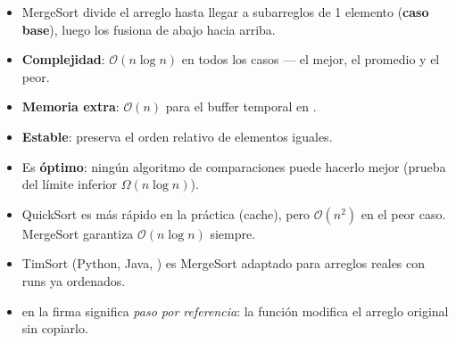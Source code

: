 \documentclass[12pt, oneside]{article}
\begin{document}
\begin{recuerda}
\begin{itemize}
  \item MergeSort divide el arreglo hasta llegar a subarreglos de 1 elemento
        (\textbf{caso base}), luego los fusiona de abajo hacia arriba.
  \item \textbf{Complejidad}: $\mathcal{O}(n \log n)$ en todos los casos —
        el mejor, el promedio y el peor.
  \item \textbf{Memoria extra}: $\mathcal{O}(n)$ para el buffer temporal en
        .
  \item \textbf{Estable}: preserva el orden relativo de elementos iguales.
  \item Es \textbf{óptimo}: ningún algoritmo de comparaciones puede hacerlo
        mejor (prueba del límite inferior $\Omega(n \log n)$).
  \item QuickSort es más rápido en la práctica (cache), pero $\mathcal{O}(n^2)$
        en el peor caso. MergeSort garantiza $\mathcal{O}(n \log n)$ siempre.
  \item TimSort (Python, Java, ) es MergeSort adaptado
        para arreglos reales con runs ya ordenados.
  \item {} en la firma significa \textit{paso por referencia}:
        la función modifica el arreglo original sin copiarlo.
\end{itemize}
\end{recuerda}
\end{document}
